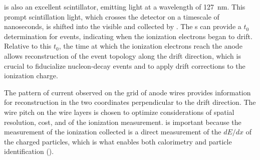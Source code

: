  is also an excellent scintillator, emitting  light at a wavelength of \SI{127}{\nano\meter}. This prompt scintillation light, which crosses the detector on a timescale of nanoseconds, is shifted into the visible and collected by . The s can provide a $t_{0}$ determination for events, indicating when the ionization electrons began to drift. Relative to this $t_{0}$, the time at which the ionization electrons reach the anode allows reconstruction of the event topology along the drift direction, which is crucial to fiducialize nucleon-decay events and to apply drift corrections to the ionization charge.

The pattern of current observed on the grid of anode wires provides information for reconstruction in the two coordinates perpendicular to the drift direction. The wire pitch on the wire layers is chosen to optimize considerations of  spatial resolution, cost, and  of the ionization measurement.  is important because the measurement of the ionization collected is a direct measurement of the $dE/dx$ of the charged particles, which is what enables both calorimetry and particle identification ().

